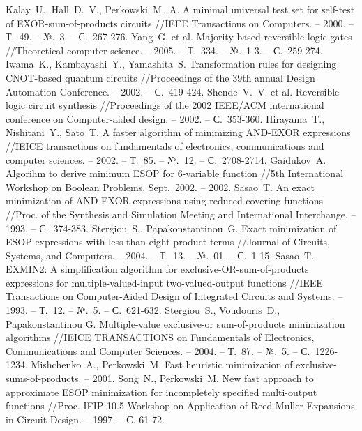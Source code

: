 \documentclass[a4paper,12pt,titlepage]{article}
\begin{document}
\begin{raggedright}
    \begin{thebibliography}{99}
         Kalay~U., Hall~D.~V., Perkowski~M.~A. A minimal universal test set for self-test of EXOR-sum-of-products circuits //IEEE Transactions on Computers. – 2000. – Т.~49. – №.~3. – С.~267-276.
         Yang~G. et al. Majority-based reversible logic gates //Theoretical computer science. – 2005. – Т.~334. – №.~1-3. – С.~259-274.
         Iwama~K., Kambayashi~Y., Yamashita~S. Transformation rules for designing CNOT-based quantum circuits //Proceedings of the 39th annual Design Automation Conference. – 2002. – С.~419-424.
         Shende~V.~V. et al. Reversible logic circuit synthesis //Proceedings of the 2002 IEEE/ACM international conference on Computer-aided design. – 2002. – С.~353-360.
         Hirayama~T., Nishitani~Y., Sato~T. A faster algorithm of minimizing AND-EXOR expressions //IEICE transactions on fundamentals of electronics, communications and computer sciences. – 2002. – Т.~85. – №.~12. – С.~2708-2714.
         Gaidukov~A. Algorihm to derive minimum ESOP for 6-variable function //5th International Workshop on Boolean Problems, Sept.~2002. – 2002.
         Sasao~T. An exact minimization of AND-EXOR expressions using reduced covering functions //Proc. of the Synthesis and Simulation Meeting and International Interchange. – 1993. – С.~374-383.
         Stergiou~S., Papakonstantinou~G. Exact minimization of ESOP expressions with less than eight product terms //Journal of Circuits, Systems, and Computers. – 2004. – Т.~13. – №.~01. – С.~1-15.
         Sasao~T. EXMIN2: A simplification algorithm for exclusive-OR-sum-of-products expressions for multiple-valued-input two-valued-output functions //IEEE Transactions on Computer-Aided Design of Integrated Circuits and Systems. – 1993. – Т.~12. – №.~5. – С.~621-632.
         Stergiou~S., Voudouris~D., Papakonstantinou G. Multiple-value exclusive-or sum-of-products minimization algorithms //IEICE TRANSACTIONS on Fundamentals of Electronics, Communications and Computer Sciences. – 2004. – Т.~87. – №.~5. – С.~1226-1234.
         Mishchenko~A., Perkowski~M. Fast heuristic minimization of exclusive-sums-of-products. – 2001.
         Song~N., Perkowski~M. New fast approach to approximate ESOP minimization for incompletely specified multi-output functions //Proc. IFIP 10.5 Workshop on Application of Reed-Muller Expansions in Circuit Design. – 1997. – С. 61-72.

\end{thebibliography}
\end{raggedright}
\end{document}
